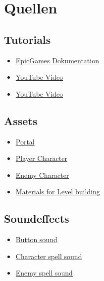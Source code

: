 \documentclass[oneside]{ausarbeitung}
\begin{document}
\chapter{Quellen}
\label{cha:quellen}


\section{Tutorials}
\label{sec:tutorials}

\begin{itemize}
    \item \href{https://dev.epicgames.com/documentation/en-us/unreal-engine/understanding-the-basics-of-unreal-engine}{EpicGames Dokumentation}
    \item \href{https://youtu.be/L9qixi858Ag?feature=shared}{YouTube Video}
    \item \href{https://www.youtube.com/watch?v=4AdGIPV1Yw4}{YouTube Video}
\end{itemize}

\section{Assets}
\label{sec:assets}

\begin{itemize}
    \item \href{https://fab.com/s/e063e89ca643}{Portal}
    \item \href{https://fab.com/s/e780a4984cc7}{Player Character}
    \item \href{https://fab.com/s/66c60dfd1cbf}{Enemy Character}
    \item \href{https://fab.com/s/9d6c2ca3c134}{Materials for Level building}
\end{itemize}

\section{Soundeffects}
\label{sec:soundeffects}

\begin{itemize}
    \item \href{https://www.youtube.com/watch?v=h8y0JMVwdmM&ab_channel=SoundLibrary}{Button sound}
    \item \href{https://www.youtube.com/watch?v=SJNZDvpGBG8&list=PLpyrFKkVGmcQSYKqGl8Z_dCLQvvtbPMKf&index=13&ab_channel=SoundEffectsSoundCuration}{Character spell sound}
    \item \href{https://www.youtube.com/watch?v=-f2rxR2GC8s&list=PLpyrFKkVGmcQSYKqGl8Z_dCLQvvtbPMKf&index=9&ab_channel=SoundEffectsSoundCuration}{Enemy spell sound}
\end{itemize}

\appendix

\printbibliography[heading=bibintoc]
\end{document}
